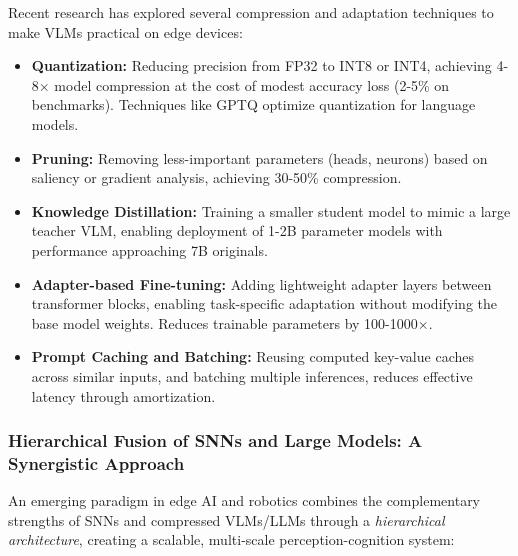 Recent research has explored several compression and adaptation techniques to make VLMs practical on edge devices:

\begin{itemize}
    \item \textbf{Quantization:} Reducing precision from FP32 to INT8 or INT4, achieving 4-8× model compression at 
    the cost of modest accuracy loss (2-5\% on benchmarks). Techniques like GPTQ \cite{frantar2023gptq} optimize 
    quantization for language models.
    
    \item \textbf{Pruning:} Removing less-important parameters (heads, neurons) based on saliency or gradient analysis, 
    achieving 30-50\% compression.
    
    \item \textbf{Knowledge Distillation:} Training a smaller student model to mimic a large teacher VLM, enabling 
    deployment of 1-2B parameter models with performance approaching 7B originals.
    
    \item \textbf{Adapter-based Fine-tuning:} Adding lightweight adapter layers between transformer blocks, enabling 
    task-specific adaptation without modifying the base model weights. Reduces trainable parameters by 100-1000×.
    
    \item \textbf{Prompt Caching and Batching:} Reusing computed key-value caches across similar inputs, and batching 
    multiple inferences, reduces effective latency through amortization.
\end{itemize}


\subsubsection{Hierarchical Fusion of SNNs and Large Models: A Synergistic Approach}

An emerging paradigm in edge AI and robotics combines the complementary strengths of SNNs and compressed 
VLMs/LLMs through a \emph{hierarchical architecture}, creating a scalable, multi-scale perception-cognition system:

